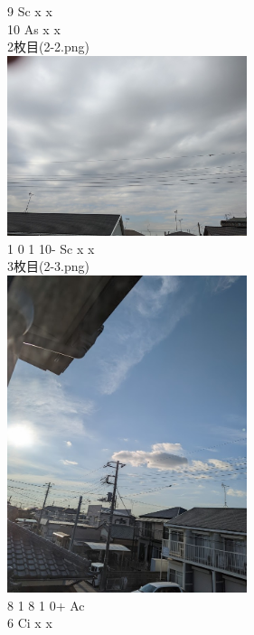 \documentclass{jsarticle}
\newenvironment{problems}
{
  \renewcommand\labelenumi{\doublebox{\arabic{enumi}}}
  \begin{enumerate}
}{
  \end{enumerate}
  \renewcommand\labelenumi{\arabic{enumi}.}
}
\begin{document}
\begin{problems}
9 Sc x x\\
10 As x x\\
2枚目(2-2.png)\\
\includegraphics[width=7cm]{2-2.png}\\
1 0 1
10- Sc x x\\


3枚目(2-3.png)\\
\includegraphics[width=7cm]{2-3.png}\\
8
1 8 1
0+ Ac\\
6 Ci x x\\


\end{problems}
\end{document}
